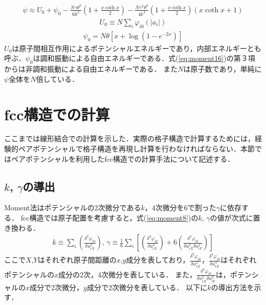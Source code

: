 \begin{eqnarray}
\label{eq:moment16}
\psi \approx U_0+\psi_0-\frac{N\gamma\theta^2}{6k^2}\left(1+\frac{x \coth x}{2}\right)
-\frac{N\gamma^2\theta^3}{4k^4}\left(1+\frac{x \coth x}{2}\right)(x \coth x + 1)
\end{eqnarray}
\begin{eqnarray}
\label{eq:moment17}
U_0\equiv N\sum_i\varphi_{i0}(|a_i|)
\end{eqnarray}
\begin{eqnarray}
\label{eq:moment18}
\psi_0 = N\theta[x+\log{(1-e^{-2x})}]
\end{eqnarray}
$U_0$は原子間相互作用によるポテンシャルエネルギーであり，内部エネルギーとも呼ぶ．$\psi_0$は調和振動による自由エネルギーである．式(\ref{eq:moment16})の第３項からは非調和振動による自由エネルギーである．
また$N$は原子数であり，単純に$\psi$全体を$N$倍している．
\section{fcc構造での計算}
\label{sec:fcc}
ここまでは線形結合での計算を示した．実際の格子構造で計算するためには，経験的ペアポテンシャルで格子構造を再現し計算を行わなければならない．本節ではペアポテンシャルを利用したfcc構造での計算手法について記述する．

\subsection{$k$, $\gamma$の導出}
Moment法はポテンシャルの2次微分である$k$，4次微分を6で割った$\gamma$に依存する．
fcc構造では原子配置を考慮すると，式(\ref{eq:moment8})の$k$, $\gamma$の値が次式に置き換わる．
\begin{eqnarray}
\label{eq:moment19}
k \equiv 
\sum_i\left( \frac{\delta^2\varphi_{i0}}{\delta u_{iX}^2}\right),\,
\gamma\equiv\frac{1}{6}\sum_i\left[\left( \frac{\delta^4\varphi_{i0}}{\delta u_{iX}^4} \right)
+6\left( \frac{\delta^4\varphi_{i0}}{\delta u_{iX}^2\delta u_{iY}^2} \right)
\right]
\end{eqnarray}
ここで$X$,$Y$はそれぞれ原子間距離の$x$,$y$成分を表しており，$\frac{\delta^2\varphi_{i0}}{\delta u_{iX}^2}$，$\frac{\delta^4\varphi_{i0}}{\delta u_{iX}^4}$はそれぞれポテンシャルの$x$成分の2次，4次微分を表している．
また，$\frac{\delta^4\varphi_{i0}}{\delta u_{iX}^2\delta u_{iY}^2}$は，ポテンシャルの$x$成分で2次微分，$y$成分で2次微分を表している．
以下に$k$の導出方法を示す．

